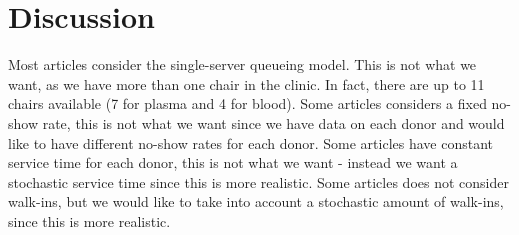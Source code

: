 \documentclass[a4paper,12pt]{article}
\begin{document}
\section{Discussion}


Most articles consider the single-server queueing model. This is not what we want, as we have more than one chair in the clinic. In fact, there are up to 11 chairs available (7 for plasma and 4 for blood). Some articles considers a fixed no-show rate, this is not what we want since we have data on each donor and would like to have different no-show rates for each donor. Some articles have constant service time for each donor, this is not what we want - instead we want a stochastic service time since this is more realistic. Some articles does not consider walk-ins, but we would like to take into account a stochastic amount of walk-ins, since this is more realistic. 






\end{document}
